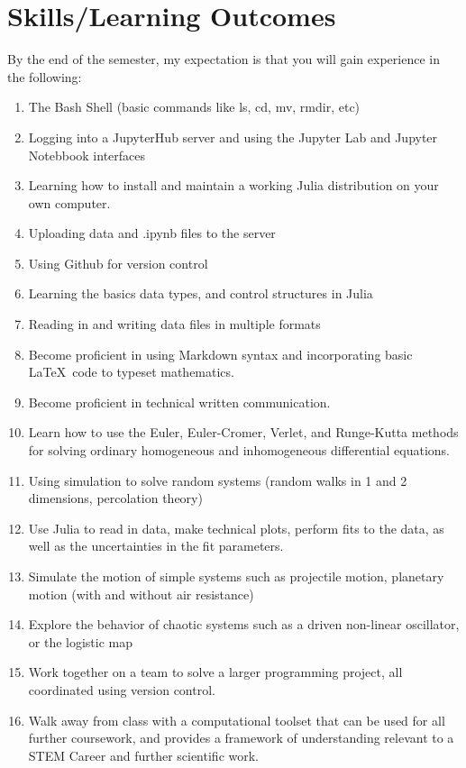 \documentclass[justified]{tufte-handout}
\begin{document}
\section*{Skills/Learning Outcomes}
By the end of the semester, my expectation is that you will gain experience in the following:
\begin{enumerate}
\item The Bash Shell (basic commands like ls, cd, mv, rmdir, etc)
\item Logging into a JupyterHub server and using the Jupyter Lab and Jupyter Notebbook interfaces
\item Learning how to install and maintain a working Julia distribution on your own computer.
\item Uploading data and .ipynb files to the server
\item Using Github for version control 
\item Learning the basics data types, and control structures in Julia
\item Reading in and writing data files in multiple formats
\item Become proficient in using Markdown syntax and incorporating basic \LaTeX\ code to typeset mathematics.
\item Become proficient in technical written communication.
\item Learn how to use the Euler, Euler-Cromer, Verlet, and Runge-Kutta methods for solving ordinary homogeneous and inhomogeneous differential equations.
\item Using simulation to solve random systems (random walks in 1 and 2 dimensions, percolation theory) 
\item Use Julia to read in data, make technical plots, perform fits to the data, as well as the uncertainties in the fit parameters.
\item Simulate the motion of simple systems such as projectile motion, planetary motion (with and without air resistance)
\item Explore the behavior of chaotic systems such as a driven non-linear oscillator, or the logistic map
\item Work together on a team to solve a larger programming project, all coordinated using version control.
\item Walk away from class with a computational toolset that can be used for all further coursework, and provides a framework of understanding relevant to a STEM Career and further scientific work. 
\end{enumerate}
\end{document}
